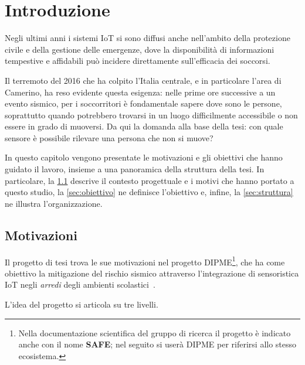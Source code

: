 \chapter{Introduzione}
\label{cap:introduzione}

Negli ultimi anni i sistemi IoT si sono diffusi anche nell'ambito della protezione
civile e della gestione delle emergenze, dove la disponibilità di informazioni
tempestive e affidabili può incidere direttamente sull'efficacia dei soccorsi.

Il terremoto del 2016 che ha colpito l'Italia centrale, e in particolare l'area di
Camerino, ha reso evidente questa esigenza: nelle prime ore successive a un evento
sismico, per i soccorritori è fondamentale sapere dove sono le persone, soprattutto
quando potrebbero trovarsi in un luogo difficilmente accessibile o non essere in grado
di muoversi. Da qui la domanda alla base della tesi: con quale
sensore è possibile rilevare una persona che non si muove?

In questo capitolo vengono presentate le motivazioni e gli obiettivi che hanno guidato
il lavoro, insieme a una panoramica della struttura della tesi. In particolare, la
\cref{sec:motivazioni} descrive il contesto progettuale e i motivi che hanno portato a
questo studio, la \cref{sec:obiettivo} ne definisce l'obiettivo e, infine, la
\cref{sec:struttura} ne illustra l'organizzazione.

\section{Motivazioni}
\label{sec:motivazioni}

Il progetto di tesi trova le sue motivazioni nel progetto
DIPME\footnote{Nella documentazione scientifica del gruppo di ricerca il progetto è
indicato anche con il nome \textbf{SAFE}; nel seguito si userà DIPME per
riferirsi allo stesso ecosistema.}, che ha come obiettivo la mitigazione del rischio
sismico attraverso l'integrazione di sensoristica IoT negli \emph{arredi} degli
ambienti scolastici~\cite{slideUprise}.

L'idea del progetto si articola su tre livelli.

